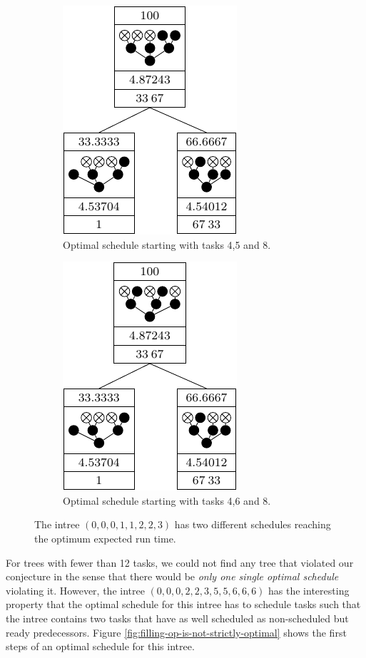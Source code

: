 \begin{figure}[th]
  \centering
  \begin{subfigure}{.45\textwidth}
    \centering
    \includegraphics{p3/suboptimal/000111223_opt458.pdf}
    \caption{Optimal schedule starting with tasks 4,5 and 8.}
  \end{subfigure}
  \quad
  \begin{subfigure}{.45\textwidth}
    \centering
    \includegraphics{p3/suboptimal/000111223_opt468.pdf}
    \caption{Optimal schedule starting with tasks 4,6 and 8.}
  \end{subfigure}
  \caption{The intree $(0,0,0,1,1,2,2,3)$ has two different schedules reaching the optimum expected run time.}
  \label{fig:filling-up-without-loss-of-generality}
\end{figure}

For trees with fewer than 12 tasks, we could not find any tree that violated our conjecture in the sense that there would be \emph{only one single optimal schedule} violating it. However, the intree $(0,0,0,2,2,3,5,5,6,6,6)$ has the interesting property that the optimal schedule for this intree has to schedule tasks such that the intree contains two tasks that have as well scheduled as non-scheduled but ready predecessors. Figure \ref{fig:filling-op-is-not-strictly-optimal} shows the first steps of an optimal schedule for this intree.

